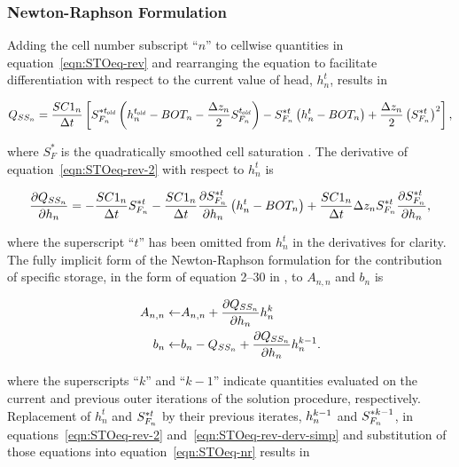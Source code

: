 \subsubsection{Newton-Raphson Formulation}

Adding the cell number subscript ``$n$'' to cellwise quantities in equation~\ref{eqn:STOeq-rev} and rearranging the equation to facilitate differentiation with respect to the current value of head, $h_n^t$, results in

\begin{equation}
	\label{eqn:STOeq-rev-2}
	Q_{SS_n} = \frac{SC1_n}{\Delta t} \left[S_{F_n}^{\ast t_\mathit{\kern -0.07em old}} \left( h_n^{t_\mathit{\kern -0.07em old}} - BOT_n - \frac{\Delta z_n}{2} S_{F_n}^{t_\mathit{\kern -0.07em old}} \right) -S_{F_n}^{\ast t} \left( h_n^t - BOT_n \right) + \frac{\Delta z_n}{2} \left( S_{F_n}^{\ast t} \right)^2 \right] ,
\end{equation}

\noindent where $S_F^\ast$ is the quadratically smoothed cell saturation \citep[see][Eq.~4--5]{modflow6gwf}. The derivative of equation~\ref{eqn:STOeq-rev-2} with respect to $h_n^t$ is 

\begin{equation}
	\label{eqn:STOeq-rev-derv-simp}
	\frac{\partial Q_{SS_n}}{\partial h_n} = -\frac{SC1_n}{\Delta t} S_{F_n}^{\ast t} - \frac{SC1_n}{\Delta t} \frac{\partial S_{F_n}^{\ast t}}{\partial h_n} \left( h_n^t - BOT_n \right) + \frac{SC1_n}{\Delta t} \Delta z_n S_{F_n}^{\ast t}  \frac{\partial S_{F_n}^{\ast t}}{\partial h_n} ,
\end{equation}

\noindent where the superscript ``$t$'' has been omitted from $h_n^t$ in the derivatives for clarity. The fully implicit form of the Newton-Raphson formulation for the contribution of specific storage, in the form of equation 2--30 in \cite{modflow6gwf}, to $A_{n,n}$ and $b_n$ is

\begin{equation}
	\label{eqn:STOeq-nr}
	\begin{aligned}
	A_{n,n} \leftarrow & A_{n,n} + \frac{\partial Q_{SS_n}}{\partial h_n} h_n^k \\
	b_n \leftarrow & b_n - Q_{SS_n} + \frac{\partial Q_{SS_n}}{\partial h_n} h_n^{k-1} .
	\end{aligned}
\end{equation}

\noindent where the superscripts ``$k$'' and ``$k-1$'' indicate quantities evaluated on the current and previous outer iterations of the solution procedure, respectively. Replacement of $h_n^t$ and $S_{F_n}^{\ast t}$ by their previous iterates, $h_n^{k-1}$ and $S_{F_n}^{\ast k-1}$, in equations~\ref{eqn:STOeq-rev-2} and~\ref{eqn:STOeq-rev-derv-simp} and substitution of those equations into equation~\ref{eqn:STOeq-nr}  results in

